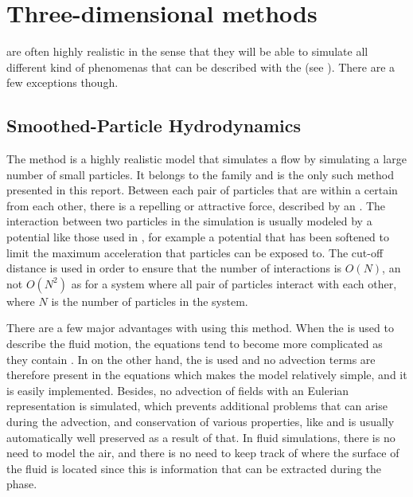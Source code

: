 \section{Three-dimensional methods}

 are often highly realistic in the sense that they will be able to simulate all different kind of phenomenas that can be described with the  (see ). There are a few exceptions though.

\subsection{Smoothed-Particle Hydrodynamics}

The \SPH method is a highly realistic model that simulates a flow by simulating a large number of small particles. It belongs to the family  and is the only such method presented in this report. Between each pair of particles that are within a certain  from each other, there is a repelling or attractive force, described by an \ODE. The interaction between two particles in the simulation is usually modeled by a potential like those used in \MD, for example a \LJ potential that has been softened to limit the maximum acceleration that particles can be exposed to. The cut-off distance is used in order to ensure that the number of interactions is $O(N)$, an not $O(N^2)$ as for a system where all pair of particles interact with each other, where $N$ is the number of particles in the system.

There are a few major advantages with using this method. When the  is used to describe the fluid motion, the equations tend to become more complicated as they contain . In \SPH on the other hand, the  is used and no advection terms are therefore present in the equations which makes the model relatively simple, and it is easily implemented. Besides, no advection of fields with an Eulerian representation is simulated, which prevents additional problems that can arise during the advection, and conservation of various properties, like \momentum and \energy is usually automatically well preserved as a result of that. In fluid simulations, there is no need to model the air, and there is no need to keep track of where the surface of the fluid is located since this is information that can be extracted during the  phase.

